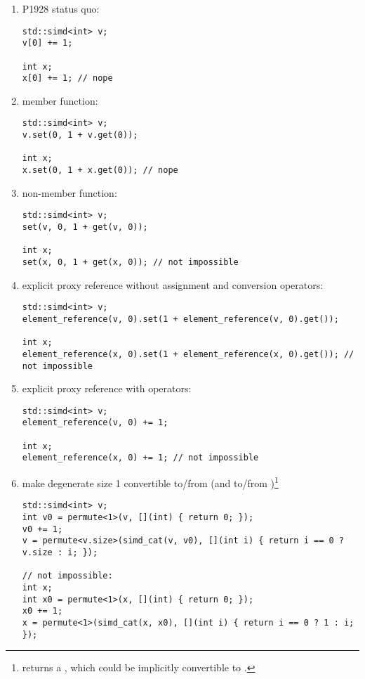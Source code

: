 \begin{enumerate}
  \item P1928 status quo:\label{explP1928}
\medskip\begin{lstlisting}[style=Vc]
std::simd<int> v;
v[0] += 1;

int x;
x[0] += 1; // nope
\end{lstlisting}

\item {} member function:\label{memberset}
\medskip\begin{lstlisting}[style=Vc]
std::simd<int> v;
v.set(0, 1 + v.get(0));

int x;
x.set(0, 1 + x.get(0)); // nope
\end{lstlisting}

\item {} non-member function:\label{nonmemberset}
\medskip\begin{lstlisting}[style=Vc]
std::simd<int> v;
set(v, 0, 1 + get(v, 0));

int x;
set(x, 0, 1 + get(x, 0)); // not impossible
\end{lstlisting}

\item explicit proxy reference without assignment and conversion operators:\label{proxyset}
\medskip\begin{lstlisting}[style=Vc]
std::simd<int> v;
element_reference(v, 0).set(1 + element_reference(v, 0).get());

int x;
element_reference(x, 0).set(1 + element_reference(x, 0).get()); // not impossible
\end{lstlisting}

\item explicit proxy reference with operators:\label{proxyoperators}
\medskip\begin{lstlisting}[style=Vc]
std::simd<int> v;
element_reference(v, 0) += 1;

int x;
element_reference(x, 0) += 1; // not impossible
\end{lstlisting}

\item make degenerate size 1 \simdT convertible to/from  (and \mask to/from )\footnote{ returns a , which could be implicitly convertible to .}
  \medskip\begin{lstlisting}[style=Vc]
std::simd<int> v;
int v0 = permute<1>(v, [](int) { return 0; });
v0 += 1;
v = permute<v.size>(simd_cat(v, v0), [](int i) { return i == 0 ? v.size : i; });

// not impossible:
int x;
int x0 = permute<1>(x, [](int) { return 0; });
x0 += 1;
x = permute<1>(simd_cat(x, x0), [](int i) { return i == 0 ? 1 : i; });
  \end{lstlisting}

\end{enumerate}

